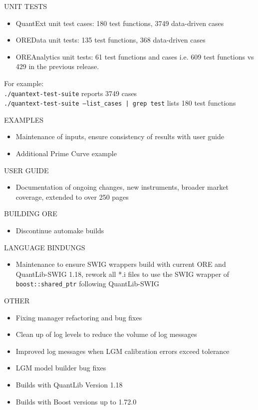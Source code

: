 \documentclass[12pt, a4paper]{article}
\begin{document}
\bigskip
UNIT TESTS

\begin{itemize}
\item QuantExt unit test cases: 180 test functions, 3749 data-driven cases
\item OREData unit tests: 135 test functions, 368 data-driven cases 
\item OREAnalytics unit tests: 61 test functions and cases
i.e. 609 test functions vs 429 in the previous release.
\end{itemize}

For example:\\
{\tt ./quantext-test-suite} reports 3749 cases \\
{\tt ./quantext-test-suite --list\_cases | grep test} lists 180 test functions

\bigskip
EXAMPLES

\begin{itemize}
\item Maintenance of inputs, ensure consistency of results with user guide
\item Additional Prime Curve example
\end{itemize}

\bigskip
USER GUIDE

\begin{itemize}
\item Documentation of ongoing changes, new instruments, broader market coverage,
  extended to over 250 pages
\end{itemize}

\bigskip
BUILDING ORE

\begin{itemize}
\item Discontinue automake builds
\end{itemize}

\bigskip
LANGUAGE BINDUNGS

\begin{itemize}
\item Maintenance to ensure SWIG wrappers build with current ORE and QuantLib-SWIG 1.18,
  rework all *.i files to use the SWIG wrapper of {\tt boost::shared\_ptr} following QuantLib-SWIG
\end{itemize}

\bigskip
OTHER

\begin{itemize}
\item Fixing manager refactoring and bug fixes
\item Clean up of log levels to reduce the volume of log messages
\item Improved log messages when LGM calibration errors exceed tolerance
\item LGM model builder bug fixes
\item Builds with QuantLib Version 1.18
\item Builds with Boost versions up to 1.72.0
\end{itemize}
\end{document}
